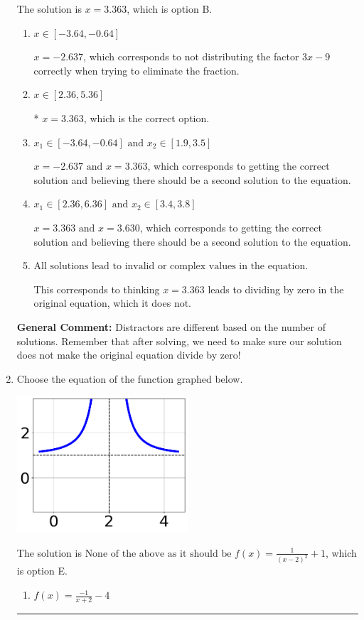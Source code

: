 \documentclass{extbook}[14pt]
\newcommand{\litem}[1]{\item #1

\rule{\textwidth}{0.4pt}}
\begin{document}
\begin{enumerate}
{The solution is \( x = 3.363 \), which is option B.\begin{enumerate}[label=\Alph*.]
\item \( x \in [-3.64,-0.64] \)

$x = -2.637$, which corresponds to not distributing the factor $3x -9$ correctly when trying to eliminate the fraction.
\item \( x \in [2.36,5.36] \)

* $x = 3.363$, which is the correct option.
\item \( x_1 \in [-3.64, -0.64] \text{ and } x_2 \in [1.9,3.5] \)

$x = -2.637 \text{ and } x = 3.363$, which corresponds to getting the correct solution and believing there should be a second solution to the equation.
\item \( x_1 \in [2.36, 6.36] \text{ and } x_2 \in [3.4,3.8] \)

$x = 3.363 \text{ and } x = 3.630$, which corresponds to getting the correct solution and believing there should be a second solution to the equation.
\item \( \text{All solutions lead to invalid or complex values in the equation.} \)

This corresponds to thinking $x = 3.363$ leads to dividing by zero in the original equation, which it does not.
\end{enumerate}

\textbf{General Comment:} Distractors are different based on the number of solutions. Remember that after solving, we need to make sure our solution does not make the original equation divide by zero!
}
\litem{
Choose the equation of the function graphed below.

\begin{center}
    \includegraphics[width=0.5\textwidth]{../Figures/rationalGraphToEquationCopyA.png}
\end{center}




The solution is \( \text{None of the above as it should be } f(x) = \frac{1}{(x - 2)^2} + 1 \), which is option E.\begin{enumerate}[label=\Alph*.]
\item \( f(x) = \frac{-1}{x + 2} - 4 \)


\end{enumerate}}
\end{enumerate}
\end{document}
